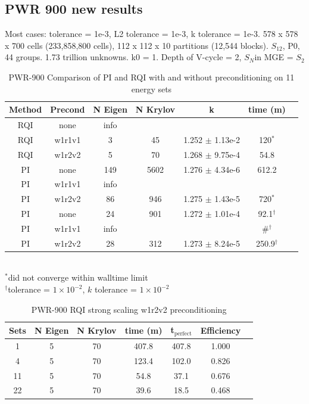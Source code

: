 \documentclass[preprint,12pt]{elsarticle}
\newcommand{\Sn}{\ensuremath{S_N}}
\begin{document}
\subsection{PWR 900 new results}
\label{subsec:PWR}
Most cases: tolerance = 1e-3, L2 tolerance = 1e-3, k tolerance = 1e-3. 578 x 578 x 700 cells (233,858,800 cells), 112 x 112 x 10 partitions (12,544 blocks). $S_{12}$, P0, 44 groups. 1.73 trillion unknowns. k0 = 1. Depth of V-cycle = 2, \Sn  in MGE = $S_2$
%
\begin{table}[!h]
\caption{PWR-900 Comparison of PI and RQI with and without preconditioning on 11 energy sets}
\label{tab:PWR all}
  \begin{center}
    \begin{tabular}{| c | c | c | c | c | c | c |}
      \hline
      Method & Precond & N Eigen & N Krylov & k & time (m) \\\hline
      RQI & none   & info &     &                     & \\
      RQI & w1r1v1 & 3   & 45   & 1.252 $\pm$ 1.13e-2 & 120$^*$ \\
      RQI & w1r2v2 & 5   & 70   & 1.268 $\pm$ 9.75e-4 & 54.8 \\
      PI  & none   & 149 & 5602 & 1.276 $\pm$ 4.34e-6 & 612.2 \\
      PI  & w1r1v1 & info &     &                     & \\
      PI  & w1r2v2 & 86  & 946  & 1.275 $\pm$ 1.43e-5 & 720$^*$ \\
      \hline
      PI  & none   & 24  & 901  & 1.272 $\pm$ 1.01e-4 & 92.1$^\dagger$ \\
      PI  & w1r1v1 & info &     &                     & \#$^\dagger$\\
      PI  & w1r2v2 & 28  & 312  & 1.273 $\pm$ 8.24e-5 & 250.9$^\dagger$ \\
      \hline
    \end{tabular}\\
    $^{*}$did not converge within walltime limit\\
    $^{\dagger}$tolerance = $1 \times 10^{-2}$, $k$ tolerance = $1 \times 10^{-2}$
  \end{center}
\end{table}

\begin{table}[!h]
\caption{PWR-900 RQI strong scaling w1r2v2 preconditioning}
\label{tab:PWR rqi strong scaling}
  \begin{center}
    \begin{tabular}{| c | c | c | c | c | c | c |}
     \hline
      Sets & N Eigen & N Krylov & time (m) & t$_{\text{perfect}}$ & Efficiency \\\hline
      1   & 5 & 70 & 407.8 & 407.8 & 1.000 \\
      4   & 5 & 70 & 123.4 & 102.0 & 0.826\\
      11  & 5 & 70 & 54.8  & 37.1  & 0.676\\
      22  & 5 & 70 & 39.6  & 18.5  & 0.468\\
      \hline
    \end{tabular}
  \end{center}
\end{table}
\end{document}
